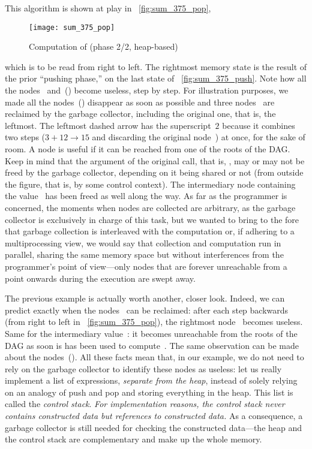 This algorithm is shown at play in \fig~\vref{fig:sum_375_pop},
\begin{figure}[t]
\centering
\texttt{[image: sum\_375\_pop]}
\caption{Computation of  (phase 2/2,
  heap\hyp{}based)
\label{fig:sum_375_pop}}
\end{figure}
which is to be read from right to left. The rightmost memory state is
the result of the prior ``pushing phase,'' on the last state of
\fig~\ref{fig:sum_375_push}. Note how all the nodes~
and~(\erlcode{+}) become useless, step by step. For illustration
purposes, we made all the nodes~(\erlcode{+}) disappear as soon as
possible and three nodes~ are reclaimed by the garbage
collector, including the original one, that is, the leftmost. The
leftmost dashed arrow has the superscript~\(2\) because it combines
two steps (\(3+12 \rightarrow 15\) and discarding the original
node~) at once, for the sake of room. A node is useful if
it can be reached from one of the roots of the DAG. Keep in mind that
the argument of the original call, that is, \erlcode{[3,7,5]}, may or
may not be freed by the garbage collector, depending on it being
shared or not (from outside the figure, that is, by some control
context). The intermediary node containing the value~ has
been freed as well along the way. As far as the programmer is
concerned, the moments when nodes are collected are arbitrary, as the
garbage collector is exclusively in charge of this task, but we wanted
to bring to the fore that garbage collection is interleaved with the
computation or, if adhering to a multiprocessing view, we would say
that collection and computation run in parallel, sharing the same
memory space but without interferences from the programmer's point of
view---only nodes that are forever unreachable from a point onwards
during the execution are swept away.

The previous example is actually worth another, closer look. Indeed,
we can predict exactly when the nodes~ can be reclaimed:
after each step backwards (from right to left in
\fig~\vref{fig:sum_375_pop}), the rightmost node~ becomes
useless. Same for the intermediary value~: it becomes
unreachable from the roots of the DAG as soon is has been used to
compute~. The same observation can be made about the
nodes~(\erlcode{+}). All these facts mean that, in our example, we do
not need to rely on the garbage collector to identify these nodes as
useless: let us really implement a list of expressions, \emph{separate
  from the heap}, instead of solely relying on an analogy of push and
pop and storing everything in the heap. This list is called the
\emph{control stack}. \emph{For implementation reasons, the control
  stack never contains constructed data but references to constructed
  data.} As a consequence, a garbage collector is still needed for
checking the constructed data---the heap and the control stack are
complementary and make up the whole memory.

